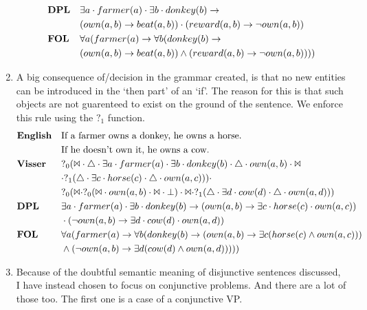 \documentclass[12pt]{article}
\begin{document}
\begin{enumerate}
\begin{align*}
&\text{\textbf{DPL}}&&\exists a \cdot farmer(a) \cdot \exists b \cdot donkey(b) \rightarrow\\&&& (own(a,b) \rightarrow beat(a,b))\cdot (reward(a,b) \rightarrow \neg own(a,b)) \\
&\text{\textbf{FOL}}&&\forall a(farmer(a) \rightarrow \forall b(donkey(b) \rightarrow\\&&& (own(a,b) \rightarrow beat(a,b))\wedge (reward(a,b) \rightarrow \neg own(a,b)))) \\
\end{align*}
\item
A big consequence of/decision in the grammar created, is that no new entities can be introduced in the `then part' of an `if'. The reason for this is that such objects are not guarenteed to exist on the ground of the sentence. We enforce this rule using the $?_1$ function.
\begin{align*}
&\text{\textbf{English}}&&\text{If a farmer owns a donkey, he owns a horse.}\\&&&\text{If he doesn't own it, he owns a cow.} \\
&\text{\textbf{Visser}}&&?_0(\Bowtie \cdot \triangle \cdot \exists a \cdot farmer(a) \cdot \exists b \cdot donkey(b) \cdot \triangle \cdot own(a,b) \cdot \Bowtie\\&&&\cdot ?_1(\triangle \cdot \exists c \cdot horse(c) \cdot \triangle \cdot own(a,c))) \cdot\\&&& ?_0(\Bowtie\cdot ?_0(\Bowtie \cdot own(a,b) \cdot \Bowtie \cdot \bot) \cdot \Bowtie \cdot ?_1(\triangle \cdot \exists d \cdot cow(d) \cdot \triangle \cdot own(a,d))) \\
&\text{\textbf{DPL}}&&\exists a \cdot farmer(a) \cdot \exists b \cdot donkey(b) \rightarrow (own(a,b) \rightarrow \exists c \cdot horse(c) \cdot own(a,c))\\&&& \cdot (\neg own(a,b) \rightarrow \exists d \cdot cow(d) \cdot own(a,d)) \\
&\text{\textbf{FOL}}&&\forall a(farmer(a) \rightarrow \forall b(donkey(b) \rightarrow (own(a,b) \rightarrow \exists c(horse(c) \wedge own(a,c)))\\&&&\wedge (\neg own(a,b) \rightarrow \exists d(cow(d) \wedge own(a,d))))) \\
\end{align*}
\item
Because of the doubtful semantic meaning of disjunctive sentences discussed, I have instead chosen to focus on conjunctive problems. And there are a lot of those too. The first one is a case of a conjunctive VP.

\end{enumerate}
\end{document}
